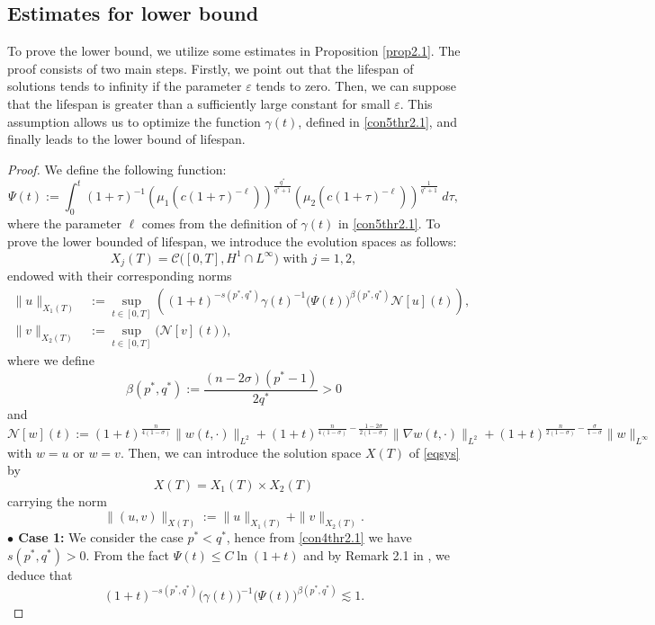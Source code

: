 \documentclass[11pt,reqno]{amsart}
\newcommand{\tron}[1]{\left( #1 \right)}
\numberwithin{equation}{section}
\theoremstyle{plain}
\begin{document}
\subsection{Estimates for lower bound}
To prove the lower bound, we utilize some estimates in Proposition \ref{prop2.1}. The proof consists of two main steps. Firstly, we point out that the lifespan of solutions tends to infinity if the parameter $\varepsilon$ tends to zero. Then, we can suppose that the lifespan is greater than a sufficiently large constant for small $\varepsilon$. This assumption allows us to optimize the function $\gamma(t)$, defined in \eqref{con5thr2.1}, and finally leads to the lower bound of lifespan.  
\begin{proof} 
We define the following function:
\begin{equation} \label{Psi_function}
\Psi(t):=\int_{0}^{t}(1+\tau)^{-1}\tron{\mu_1\tron{c(1+\tau)^{-\ell}}}^{\frac{q^*}{q^*+1}}\tron{\mu_2\tron{c(1+\tau)^{-\ell}}}^{\frac{1}{q^*+1}}\;d\tau,
\end{equation}
where the parameter $\ell$ comes from the definition of $\gamma(t)$ in \eqref{con5thr2.1}. To prove the lower bounded of lifespan, we introduce the evolution spaces as follows:
\[
X_j(T)= \mathcal{C}\big([0,T],H^1\cap L^{\infty}\big) \text{ with $j=1,2$},
\]
endowed with their corresponding norms
\begin{align*}
    \|u\|_{X_1(T)} &:=\sup _{t \in[0, T]}\left((1+t)^{-s(p^*, q^*)}\gamma(t)^{-1}\big(\Psi(t)\big)^{\beta(p^*,q^*)} \mathcal{N}[u](t)\right), \\
\|v\|_{X_2(T)} &:=\sup _{t \in[0, T]}\Big(\mathcal{N}[v](t)\Big),
\end{align*}
where we define
$$ \beta(p^*,q^*):=\frac{(n-2\sigma)(p^*-1)}{2q^*}>0 $$
and 
$$
\mathcal{N}[w](t):=(1+t)^{\frac{n}{4(1-\sigma)}}\|w(t, \cdot)\|_{L^2}+(1+t)^{\frac{n}{4(1-\sigma)}-\frac{1-2\sigma}{2(1-\sigma)}}\|\nabla w(t, \cdot)\|_{L^2}+(1+t)^{\frac{n}{2(1-\sigma)}-\frac{\sigma}{1-\sigma}}\|w\|_{L^{\infty}}
$$
with $w=u$ or $w=v$. Then, we can introduce the solution space $X(T)$ of \eqref{eqsys} by
$$
X(T)= X_1(T) \times X_2(T)
$$
carrying the norm
$$
\|(u, v)\|_{X(T)}:=\|u\|_{X_1(T)}+\|v\|_{X_2(T)} .
$$
\textbf{$\bullet$ Case 1:} We consider the case $p^*<q^*$, hence from \eqref{con4thr2.1} we have $s(p^*,q^*)>0$. From the fact $\Psi(t)\leq C\ln(1+t)$ and by Remark 2.1 in \cite{AnhRei2021}, we deduce that
\begin{equation}\label{eq0sec4.2}
(1+t)^{-s(p^*, q^*)}\big(\gamma(t)\big)^{-1}\big(\Psi(t)\big)^{\beta(p^*,q^*)}\lesssim 1.

\end{equation}
\end{proof}
\end{document}
